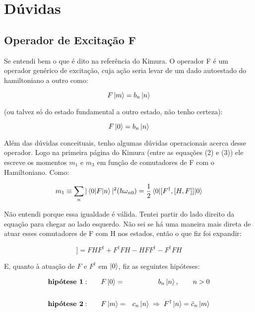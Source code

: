 \documentclass[12pt]{article}
\begin{document}
\section{Dúvidas}
\subsection{Operador de Excitação F}

Se entendi bem o que é dito na referência do Kimura. O operador F é um operador genérico de excitação, cuja ação seria levar de um dado autoestado do hamiltoniano a outro como:

\begin{equation}
F\ket{m} = b_n\ket{n}
\end{equation}

(ou talvez só do estado fundamental a outro estado, não tenho certeza):

\begin{equation}
F\ket{0} = b_n\ket{n}
\end{equation}

Além das dúvidas conceituais, tenho algumas dúvidas operacionais acerca desse operador. Logo na primeira página do Kimura (entre as equações (2) e (3)) ele escreve os momentos $m_1$ e $m_3$ em função de comutadores de F com o Hamiltoniano. Como:

\begin{equation}
m_1 \equiv \sum_n |\braket{0|F|n}|^2(\hbar \omega_{n0}) = \frac{1}{2}\braket{0|[F^\dagger,[H,F]]|0} \label{mom}
\end{equation}

Não entendi porque essa igualdade é válida. Tentei partir do lado direito da equação para chegar ao lado esquerdo. Não sei se há uma maneira mais direta de atuar esses comutadores de F com H nos estados, então o que fiz foi expandir:

\begin{equation}
[F^\dagger,[H,F]] = FHF^\dagger + F^\dagger FH - HFF^\dagger - F^\dagger FH
\end{equation}

E, quanto à atuação de $F$ e $F^\dagger$ em $\ket{0}$, fiz as seguintes hipóteses:

\begin{eqnarray}
\textbf{hipótese 1}:& \qquad F\ket{0}=& b_n\ket{n}, \qquad n>0 \\ \nonumber \\
\textbf{hipótese 2}:& \qquad F\ket{m}=& c_n\ket{n} \; \Rightarrow \; F^\dagger \ket{n}=\bar{c}_n\ket{m}
\end{eqnarray}
\end{document}
